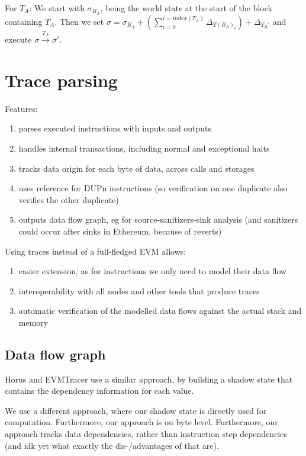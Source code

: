\documentclass[draft,final]{vutinfth} %
\begin{document}
For $T_A$: We start with $\sigma_{B_A}$, being the world state at the start of the block containing $T_A$. Then we set $\sigma = \sigma_{B_A} + (\sum_{i=0}^{i=index(T_A)}\Delta_{T(B_B)_i}) + \Delta_{T_B\prime}$ and execute $\sigma \xrightarrow{T_A} \sigma\prime$.

\section{Trace parsing}

Features:

\begin{enumerate}
    \item parses executed instructions with inputs and outputs
    \item handles internal transactions, including normal and exceptional halts
    \item tracks data origin for each byte of data, across calls and storages
    \item uses reference for DUPn instructions (so verification on one duplicate also verifies the other duplicate)
    \item outputs data flow graph, eg for source-sanitizers-sink analysis (and sanitizers could occur after sinks in Ethereum, because of reverts)
\end{enumerate}

Using traces instead of a full-fledged EVM allows:

\begin{enumerate}
    \item easier extension, as for instructions we only need to model their data flow
    \item interoperability with all nodes and other tools that produce traces
    \item automatic verification of the modelled data flows against the actual stack and memory
\end{enumerate}

\subsection{Data flow graph}

Horus and EVMTracer use a similar approach, by building a shadow state that contains the dependency information for each value.

We use a different approach, where our shadow state is directly used for computation. Furthermore, our approach is on byte level. Furthermore, our approach tracks data dependencies, rather than instruction step dependencies (and idk yet what exactly the dis-/advantages of that are).
\end{document}
